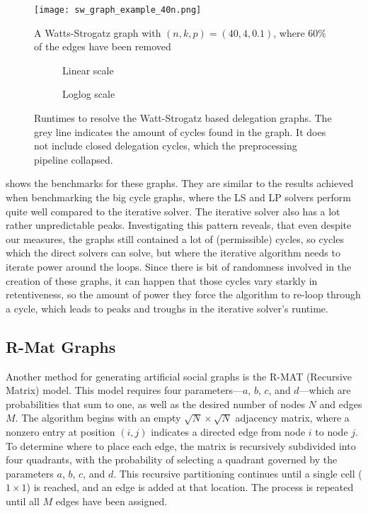 \begin{figure}
\centering
\texttt{[image: sw\_graph\_example\_40n.png]}
\caption{A Watts-Strogatz graph with $(n, k, p) = (40, 4, 0.1)$, where $60\%$ of the edges have been removed}
\label{fig:ws_example}
\end{figure}

\begin{figure}[t]
    \centering
    \begin{subfigure}[t]{0.45\textwidth}
        \centering
        \caption{Linear scale}
        \label{subfig:sw_linear}
    \end{subfigure}
    \hfill
    \begin{subfigure}[t]{0.45\textwidth}
        \centering
        \caption{Loglog scale}
        \label{subfig:sw_loglog}
    \end{subfigure}
    \caption{Runtimes to resolve the Watt-Strogatz based delegation graphs. The grey line indicates the amount of cycles found in the graph. It does not include closed delegation cycles, which the preprocessing pipeline collapsed.}
    \label{fig:sw}
\end{figure}




 shows the benchmarks for these graphs. They are similar to the results achieved when benchmarking the big cycle graphs, where the LS and LP solvers perform quite well compared to the iterative solver. The iterative solver also has a lot rather unpredictable peaks. Investigating this pattern reveals, that even despite our measures, the graphs still contained a lot of (permissible) cycles, so cycles which the direct solvers can solve, but where the iterative algorithm needs to iterate power around the loops. Since there is bit of randomness involved in the creation of these graphs, it can happen that those cycles vary starkly in retentiveness, so the amount of power they force the algorithm to re-loop through a cycle, which leads to peaks and troughs in the iterative solver's runtime. 
 
\subsection{R-Mat Graphs}

Another method for generating artificial social graphs is the R-MAT (Recursive Matrix) model. \cite{chakrabartiRMATRecursiveModel2004} This model requires four parameters—$a$, $b$, $c$, and $d$—which are probabilities that sum to one, as well as the desired number of nodes $N$ and edges $M$. The algorithm begins with an empty $\sqrt{N} \times \sqrt{N}$ adjacency matrix, where a nonzero entry at position $(i, j)$ indicates a directed edge from node $i$ to node $j$. To determine where to place each edge, the matrix is recursively subdivided into four quadrants, with the probability of selecting a quadrant governed by the parameters $a$, $b$, $c$, and $d$. This recursive partitioning continues until a single cell ($1 \times 1$) is reached, and an edge is added at that location. The process is repeated until all $M$ edges have been assigned.

